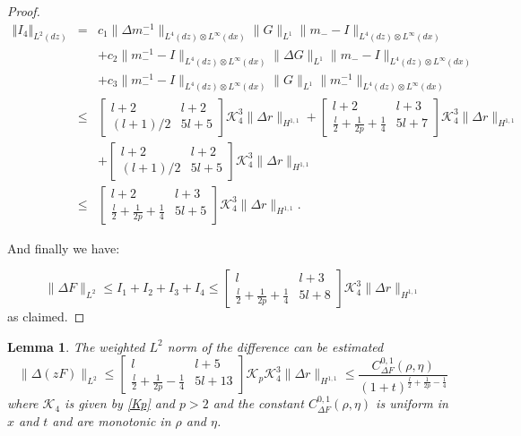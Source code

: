 \documentclass{amsart}
\theoremstyle{plain}
\newtheorem{lemma}[theorem]{Lemma}
\theoremstyle{remark}
\numberwithin{equation}{section}
\newcommand{\norm}[2]{\left\Vert #1\right\Vert_{#2}}
\newcommand{\Twomat}[4]
{
\left[
	\begin{array}{cc}
		{#1}	&	{#2}	\\[10pt]
		{#3}	&	{#4}
		\end{array}
\right]
}
\begin{document}
\begin{proof}
    \begin{eqnarray*}
        \norm{I_4}{L^2 (dz)} & = & c_1\|\Delta m_-^{-1}\|_{L^4(dz)\otimes L^\infty(dx)}\|G\|_{L^1} \|m_--I\|_{L^4(dz)\otimes L^\infty(dx)}\\
        &&+ c_2\|m_-^{-1}-I\|_{L^4(dz)\otimes L^\infty(dx)}\|\Delta G\|_{L^1} \|m_--I\|_{L^4(dz)\otimes L^\infty(dx)}\\
        &&+ c_3\|m_-^{-1}-I\|_{L^4(dz)\otimes L^\infty(dx)}\|G\|_{L^1} \|m_-^{-1}\|_{L^4(dz)\otimes L^\infty(dx)}\\
        &\leq&\Twomat{l+2}{l+2}{(l+1)/2}{5l+5}\mathcal{K}_4^3\|\Delta r\|_{H^{1,1}}+\Twomat{l+2}{l+3}{\frac{l}{2}+\frac{1}{2p}+\frac{1}{4}}{5l+7}\mathcal{K}_4^3\|\Delta r\|_{H^{1,1}}\\
        &&+\Twomat{l+2}{l+2}{(l+1)/2}{5l+5}\mathcal{K}_4^3\|\Delta r\|_{H^{1,1}}\\
        &\leq&\Twomat{l+2}{l+3}{\frac{l}{2}+\frac{1}{2p}+\frac{1}{4}}{5l+5}\mathcal{K}_4^3\|\Delta r\|_{H^{1,1}}.
    \end{eqnarray*}

    And finally we have:

    \[\|\Delta F\|_{L^2} \leq I_1+I_2+I_3+I_4 \leq \Twomat{l}{l+3}{\frac{l}{2}+\frac{1}{2p}+\frac{1}{4}}{5l+8}\mathcal{K}_4^3\|\Delta r\|_{H^{1,1}}\]as claimed.
\end{proof}

\begin{lemma}The weighted $L^2$ norm of the difference can be estimated
\label{le:DzF}
    \begin{equation}
        \|\Delta (z F)\|_{L^2} \leq \Twomat{l}{l+5}{\frac{l}{2}+\frac{1}{2p}-\frac{1}{4}}{5l+13}\mathcal{K}_p\mathcal{K}_4^3\|\Delta r\|_{H^{1,1}} \leq \frac{C^{0,1}_{\Delta  F}(\rho, \eta)}{(1+t)^{\frac{l}{2}+\frac{1}{2p}-\frac{1}{4}}}
    \end{equation}
    where $\mathcal{K}_4$ is given by \eqref{Kp} and $p>2$ and the constant $C^{0,1}_{\Delta F}(\rho, \eta)$ is uniform in $x$ and $t$ and are monotonic in $\rho$ and $\eta$.
\end{lemma}
\end{document}
